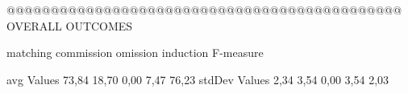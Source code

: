 @@@@@@@@@@@@@@@@@@@@@@@@@@@@@@@@@@@@@@@@@@@@@ OVERALL OUTCOMES

                matching commission   omission  induction  F-measure
      
avg Values      73,84      18,70       0,00      7,47    76,23      
stdDev Values    2,34       3,54       0,00       3,54     2,03       
